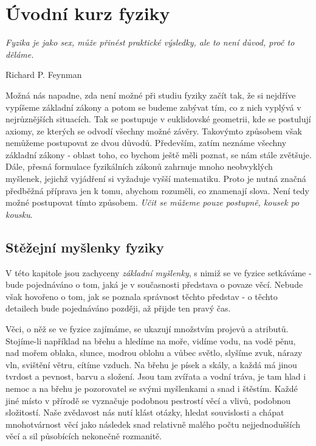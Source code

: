\setchaptertoc
\chapter{Úvodní kurz fyziky}\label{fyz:IchapI}
  \epigraph{\emph{Fyzika je jako sex, může přinést praktické výsledky, ale to není důvod, proč to 
    děláme.}}{Richard P. Feynman}


  Možná nás napadne, zda není možné při studiu fyziky začít tak, že si nejdříve vypíšeme základní
  zákony a potom se budeme zabývat tím, co z nich vyplývá v nejrůznějších situacích. Tak se
  postupuje v euklidovské geometrii, kde se postulují axiomy, ze kterých se odvodí všechny možné
  závěry. Takovýmto způsobem však nemůžeme postupovat ze dvou důvodů. Především, zatím neznáme
  všechny základní zákony - oblast toho, co bychom ještě měli poznat, se nám stále zvětšuje. Dále,
  přesná formulace fyzikálních zákonů zahrnuje mnoho neobvyklých myšlenek, jejichž vyjádření si
  vyžaduje vyšší matematiku. Proto je nutná značná předběžná příprava jen k tomu, abychom rozuměli,
  co znamenají slova. Není tedy možné postupovat tímto způsobem. \emph{Učit se můžeme pouze
  postupně, kousek po kousku}.

  \section{Stěžejní myšlenky fyziky}\label{fyz:IchapIsecII}
    V této kapitole jsou zachyceny \emph{základní myšlenky}, s nimiž se ve fyzice setkáváme - 
    bude pojednáváno o tom, jaká je v současnosti představa o povaze věcí. Nebude však hovořeno o 
    tom, jak se poznala správnost těchto představ - o těchto detailech bude pojednáváno později, až 
    přijde ten pravý čas.

    Věci, o něž se ve fyzice zajímáme, se ukazují množstvím projevů a atributů. Stojíme-li 
    například na břehu a hledíme na moře, vidíme vodu, na vodě pěnu, nad mořem oblaka, slunce, 
    modrou oblohu a vůbec světlo, slyšíme zvuk, nárazy vln, svištění větru, cítíme vzduch. Na břehu 
    je písek a skály, a každá má jinou tvrdost a pevnost, barvu a složení. Jsou tam zvířata a vodní 
    tráva, je tam hlad i nemoc a na břehu je pozorovatel se svými myšlenkami a snad i štěstím. 
    Každé jiné místo v přírodě se vyznačuje podobnou pestrostí věcí a vlivů, podobnou složitostí. 
    Naše zvědavost nás nutí klást otázky, hledat souvislosti a chápat mnohotvárnost věcí jako 
    následek snad relativně malého počtu nejjednodušších věcí a sil působících nekonečně rozmanitě.
    
